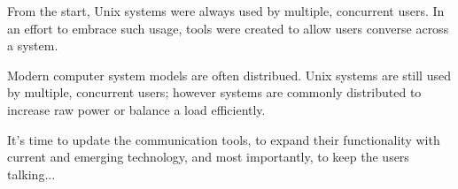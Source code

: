 
From the start, Unix systems were always used by multiple, concurrent
users. In an effort to embrace such usage, tools were created to
allow users converse across a system.


Modern computer system models are often distribued. Unix systems are
still used by multiple, concurrent users; however systems are commonly
distributed to increase raw power or balance a load efficiently. 


It's time to update the communication tools, to expand their
functionality with current and emerging technology, and most
importantly, to keep the users talking...
